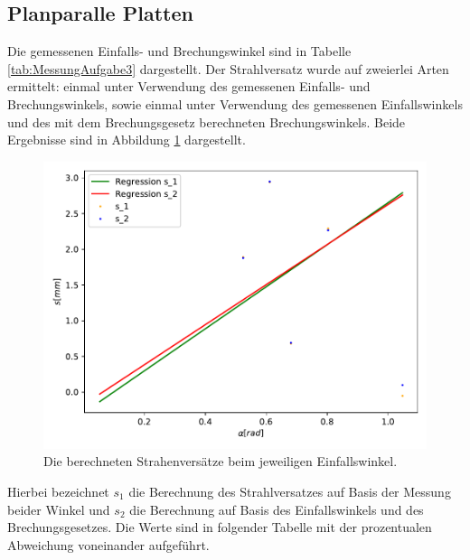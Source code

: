 \subsection{Planparalle Platten}
\label{sec:planplatteauswertung}
Die gemessenen Einfalls- und Brechungswinkel sind in Tabelle \ref{tab:MessungAufgabe3} dargestellt. Der Strahlversatz wurde auf zweierlei Arten ermittelt: einmal unter Verwendung des gemessenen Einfalls- und Brechungswinkels, sowie einmal unter Verwendung des gemessenen Einfallswinkels und des mit dem Brechungsgesetz berechneten Brechungswinkels.
Beide Ergebnisse sind in Abbildung \ref{fig:plot3ausw} dargestellt.
\begin{figure}[H]
  \centering
  \includegraphics[scale=0.7]{auswertung/plot3.pdf}
  \caption{Die berechneten Strahenversätze beim jeweiligen Einfallswinkel.}
  \label{fig:plot3ausw}
\end{figure}
\noindent
Hierbei bezeichnet $s_1$ die Berechnung des Strahlversatzes auf Basis der Messung beider Winkel und $s_2$ die Berechnung auf Basis des Einfallswinkels und des Brechungsgesetzes.
Die Werte sind in folgender Tabelle mit der prozentualen Abweichung voneinander aufgeführt.


